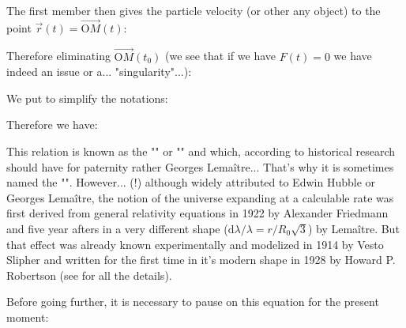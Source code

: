 	The first member then gives the particle velocity (or other any object) to the point $\vec{r}(t)=\overrightarrow{\text{O}M}(t)$:
	
	Therefore eliminating $\overrightarrow{\text{O}M}(t_0)$ (we see that if we have $F(t)=0$ we have indeed an issue or a... "singularity"...):
	
	We put to simplify the notations:
	
	Therefore we have:
	
	This relation is known as the "" or "" and which, according to historical research should have for paternity rather Georges Lemaître... That's why it is sometimes named the "". However... (!) although widely attributed to Edwin Hubble or Georges Lemaître, the notion of the universe expanding at a calculable rate was first derived from general relativity equations in 1922 by Alexander Friedmann and five year afters in a very different shape ($\mathrm{d}\lambda/\lambda =r/R_0\sqrt{3}$) by Lemaître. But that effect was already known experimentally and modelized in 1914 by Vesto Slipher and written for the first time in it's modern shape in 1928 by Howard P. Robertson (see \cite{smith1979origins} for all the details).
	
	Before going further, it is necessary to pause on this equation for the present moment:
	
